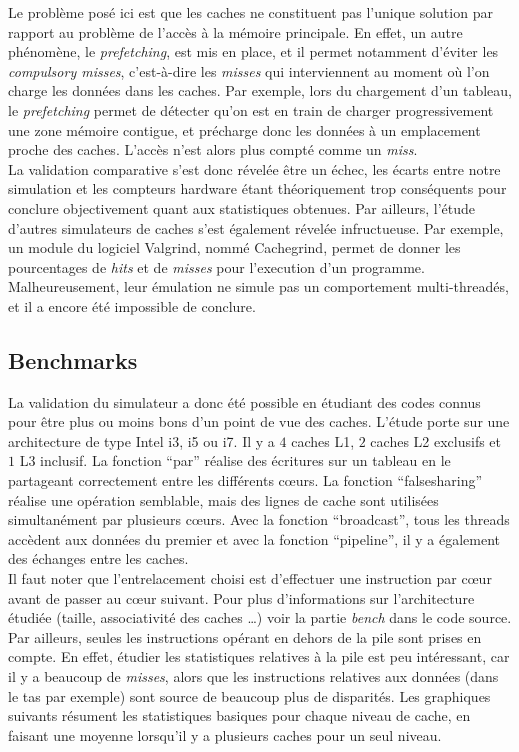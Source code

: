 Le problème posé ici est que les caches ne constituent pas l'unique solution par rapport au problème de l'accès à la mémoire principale. En effet, un autre phénomène, le \emph{prefetching}, est mis en place, et il permet notamment d'éviter les \emph{compulsory misses}, c'est-à-dire les \emph{misses} qui interviennent au moment où l'on charge les données dans les caches. Par exemple, lors du chargement d'un tableau, le \emph{prefetching} permet de détecter qu'on est en train de charger progressivement une zone mémoire contigue, et précharge donc les données à un emplacement proche des caches. L'accès n'est alors plus compté comme un \emph{miss}. \\

La validation comparative s'est donc révelée être un échec, les écarts entre notre simulation et les compteurs hardware étant théoriquement trop conséquents pour conclure objectivement quant aux statistiques obtenues. Par ailleurs, l'étude d'autres simulateurs de caches s'est également révelée infructueuse. Par exemple, un module du logiciel \textsf{Valgrind}, nommé \textsf{Cachegrind}, permet de donner les pourcentages de \emph{hits} et de \emph{misses} pour l'execution d'un programme. Malheureusement, leur émulation ne simule pas un comportement multi-threadés, et il a encore été impossible de conclure.
 
\subsection{Benchmarks}
La validation du simulateur a donc été possible en étudiant des codes connus pour être plus ou moins bons d'un point de vue des caches. L'étude porte sur une architecture de type \textsf{Intel} i3, i5 ou i7. Il y a $4$ caches L1, $2$ caches L2 exclusifs et $1$ L3 inclusif. La fonction ``par'' réalise des écritures sur un tableau en le partageant correctement entre les différents c{\oe}urs. La fonction ``falsesharing'' réalise une opération semblable, mais des lignes de cache sont utilisées simultanément par plusieurs c{\oe}urs. Avec la fonction ``broadcast'', tous les threads accèdent aux données du premier et avec la fonction ``pipeline'', il y a également des échanges entre les caches. \\

Il faut noter que l'entrelacement choisi est d'effectuer une instruction par c{\oe}ur avant de passer au c{\oe}ur suivant. Pour plus d'informations sur l'architecture étudiée (taille, associativité des caches \dots) voir la partie \emph{bench} dans le code source. Par ailleurs, seules les instructions opérant en dehors de la pile sont prises en compte. En effet, étudier les statistiques relatives à la pile est peu intéressant, car il y a beaucoup de \emph{misses}, alors que les instructions relatives aux données (dans le tas par exemple) sont source de beaucoup plus de disparités. Les graphiques suivants résument les statistiques basiques pour chaque niveau de cache, en faisant une moyenne lorsqu'il y a plusieurs caches pour un seul niveau.\\

